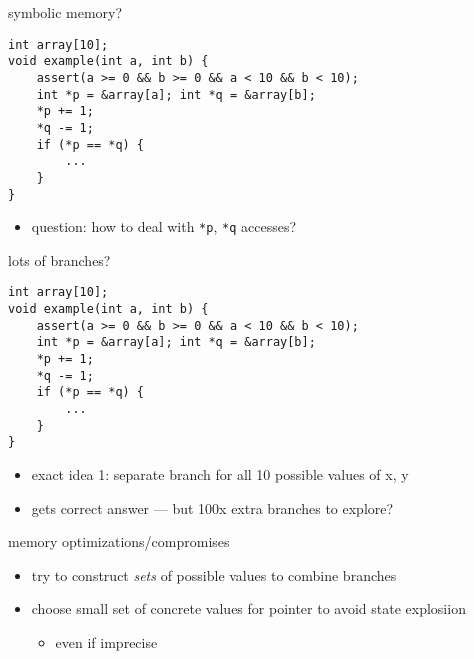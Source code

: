 \begin{frame}[fragile]{symbolic memory?}
\begin{lstlisting}[style=smaller]
int array[10];
void example(int a, int b) {
    assert(a >= 0 && b >= 0 && a < 10 && b < 10);
    int *p = &array[a]; int *q = &array[b];
    *p += 1;
    *q -= 1;
    if (*p == *q) {
        ...
    }
}
\end{lstlisting}
\begin{itemize}
\item question: how to deal with \texttt{*p}, \texttt{*q} accesses?
\end{itemize}
\end{frame}

\begin{frame}[fragile]{lots of branches?}
\begin{lstlisting}[style=smaller]
int array[10];
void example(int a, int b) {
    assert(a >= 0 && b >= 0 && a < 10 && b < 10);
    int *p = &array[a]; int *q = &array[b];
    *p += 1;
    *q -= 1;
    if (*p == *q) {
        ...
    }
}
\end{lstlisting}
\begin{itemize}
\item exact idea 1: separate branch for all 10 possible values of x, y
\item gets correct answer --- but 100x extra branches to explore?
\end{itemize}
\end{frame}

\begin{frame}{memory optimizations/compromises}
    \begin{itemize}
    \item try to construct \textit{sets} of possible values to combine branches
    \item choose small set of concrete values for pointer to avoid state explosiion
        \begin{itemize}
        \item even if imprecise
        \end{itemize}
    \end{itemize}
\end{frame}
